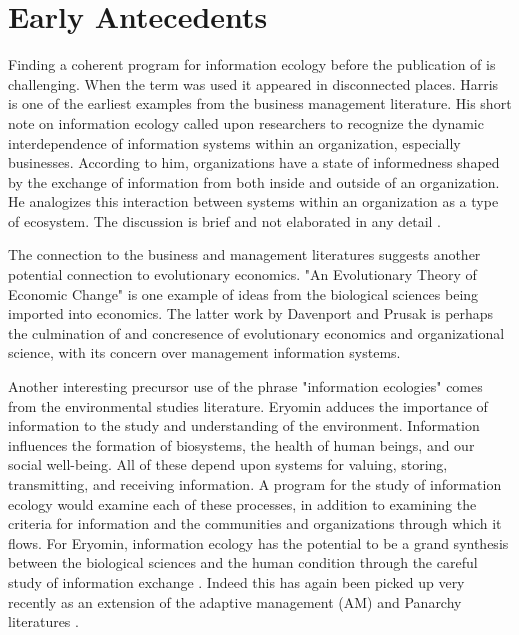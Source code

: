 \section{Early Antecedents}

Finding a coherent program for information ecology before the publication of \cite{nardi_information_1999, davenport_information_1997} is challenging. When the term was used it appeared in disconnected places. Harris is one of the earliest examples from the business management literature. His short note on information ecology called upon researchers to recognize the dynamic interdependence of information systems within an organization, especially businesses. According to him, organizations have a state of informedness shaped by the exchange of information from both inside and outside of an organization. He analogizes this interaction between systems within an organization as a type of ecosystem. The discussion is brief and not elaborated in any detail \cite{harris_information_1989}.

The connection to the business and management literatures suggests another potential connection to evolutionary economics. "An Evolutionary Theory of Economic Change" \cite{nelson_evolutionary_1985} is one example of ideas from the biological sciences being imported into economics. The latter work by Davenport and Prusak is perhaps the culmination of and concresence of evolutionary economics and organizational science, with its concern over management information systems.

Another interesting precursor use of the phrase "information ecologies" comes from the environmental studies literature. Eryomin adduces the importance of information to the study and understanding of the environment. Information influences the formation of biosystems, the health of human beings, and our social well-being. All of these depend upon systems for valuing, storing, transmitting, and receiving information. A program for the study of information ecology would examine each of these processes, in addition to examining the criteria for information and the communities and organizations through which it flows. For Eryomin, information ecology has the potential to be a grand synthesis between the biological sciences and the human condition through the careful study of information exchange \cite{eryomin_information_1998}. Indeed this has again been picked up very recently as an extension of the adaptive management (AM) and Panarchy literatures \cite{eddy_information_2014}.
